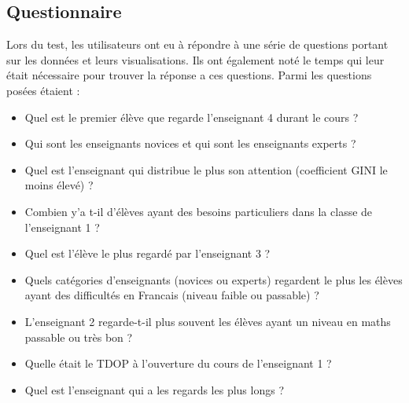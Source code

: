 \documentclass{article}
\begin{document}
\subsection{Questionnaire}
Lors du test, les utilisateurs ont eu à répondre à une série de questions portant sur les données et leurs visualisations. Ils ont également noté le temps qui leur était nécessaire pour trouver la réponse a ces questions. Parmi les questions posées étaient :
\begin{itemize}
    \item Quel est le premier élève que regarde l'enseignant 4 durant le cours ?
    \item Qui sont les enseignants novices et qui sont les enseignants experts ?
    \item Quel est l'enseignant qui distribue le plus son attention (coefficient GINI le moins élevé) ?
    \item Combien y'a t-il d'élèves ayant des besoins particuliers dans la classe de l'enseignant 1 ?
    \item Quel est l'élève le plus regardé par l'enseignant 3 ? 
    \item Quels catégories d'enseignants (novices ou experts) regardent le plus les élèves ayant des difficultés en Francais (niveau faible ou passable) ?
    \item L'enseignant 2 regarde-t-il plus souvent les élèves ayant un niveau en maths passable ou très bon ?
    \item Quelle était le TDOP à l'ouverture du cours de l'enseignant 1 ?
    \item Quel est l'enseignant qui a les regards les plus longs ?
\end{itemize}
\end{document}
